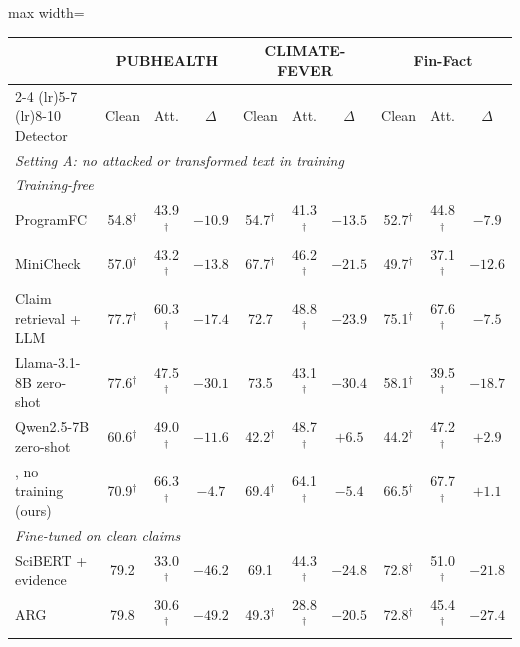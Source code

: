 \begin{table}[t]\centering\small\setlength{\tabcolsep}{3.5pt}
\begin{adjustbox}{max width=\textwidth}\begin{tabular}{lccccccccc}
\toprule
 & \multicolumn{3}{c}{PUBHEALTH} & \multicolumn{3}{c}{CLIMATE-FEVER} & \multicolumn{3}{c}{Fin-Fact} \\
\cmidrule(lr){2-4} \cmidrule(lr){5-7} \cmidrule(lr){8-10}
Detector & Clean & Att. & $\Delta$ & Clean & Att. & $\Delta$ & Clean & Att. & $\Delta$ \\
\midrule
\multicolumn{10}{l}{\emph{Setting A: no attacked or transformed text in training}} \\
\multicolumn{10}{l}{\quad\textit{Training-free}} \\
\quad ProgramFC \citep{pan2023programfc} & 54.8$^{\dagger}$ & 43.9$^{\dagger}$ & $-10.9$ & 54.7$^{\dagger}$ & 41.3$^{\dagger}$ & $-13.5$ & 52.7$^{\dagger}$ & 44.8$^{\dagger}$ & $-7.9$ \\
\quad MiniCheck \citep{tang2024minicheck} & 57.0$^{\dagger}$ & 43.2$^{\dagger}$ & $-13.8$ & 67.7$^{\dagger}$ & 46.2$^{\dagger}$ & $-21.5$ & 49.7$^{\dagger}$ & 37.1$^{\dagger}$ & $-12.6$ \\
\quad Claim retrieval + LLM \citep{pikuliak2023multiclaim} & 77.7$^{\dagger}$ & 60.3$^{\dagger}$ & $-17.4$ & 72.7 & 48.8$^{\dagger}$ & $-23.9$ & 75.1$^{\dagger}$ & 67.6$^{\dagger}$ & $-7.5$ \\
\quad Llama-3.1-8B zero-shot \citep{grattafiori2024llama3} & 77.6$^{\dagger}$ & 47.5$^{\dagger}$ & $-30.1$ & 73.5 & 43.1$^{\dagger}$ & $-30.4$ & 58.1$^{\dagger}$ & 39.5$^{\dagger}$ & $-18.7$ \\
\quad Qwen2.5-7B zero-shot \citep{qwen2024qwen25} & 60.6$^{\dagger}$ & 49.0$^{\dagger}$ & $-11.6$ & 42.2$^{\dagger}$ & 48.7$^{\dagger}$ & $+6.5$ & 44.2$^{\dagger}$ & 47.2$^{\dagger}$ & $+2.9$ \\
\quad \method{}, no training (ours) & 70.9$^{\dagger}$ & 66.3$^{\dagger}$ & $-4.7$ & 69.4$^{\dagger}$ & 64.1$^{\dagger}$ & $-5.4$ & 66.5$^{\dagger}$ & 67.7$^{\dagger}$ & $+1.1$ \\
\multicolumn{10}{l}{\quad\textit{Fine-tuned on clean claims}} \\
\quad SciBERT + evidence \citep{kotonya2020pubhealth} & 79.2 & 33.0$^{\dagger}$ & $-46.2$ & 69.1 & 44.3$^{\dagger}$ & $-24.8$ & 72.8$^{\dagger}$ & 51.0$^{\dagger}$ & $-21.8$ \\
\quad ARG \citep{hu2024arg} & 79.8 & 30.6$^{\dagger}$ & $-49.2$ & 49.3$^{\dagger}$ & 28.8$^{\dagger}$ & $-20.5$ & 72.8$^{\dagger}$ & 45.4$^{\dagger}$ & $-27.4$ \\

\end{tabular}
\end{adjustbox}
\end{table}
